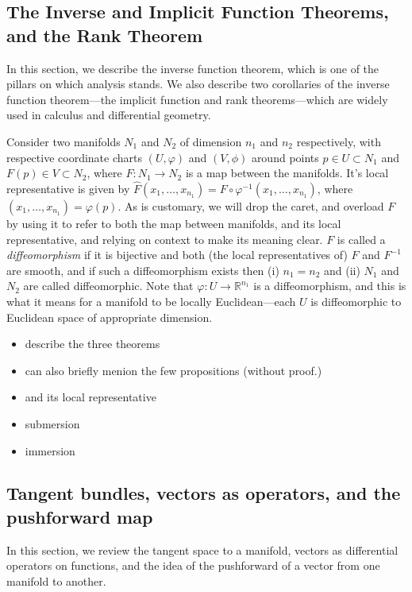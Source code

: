 \documentclass[psamsfonts]{amsart}
\theoremstyle{definition}
\theoremstyle{remark}
\newcommand*\R{\mathds{R}}
\numberwithin{equation}{section}
\begin{document}
\subsection{The Inverse and Implicit Function Theorems, and the Rank Theorem}
In this section, we describe the inverse function theorem, which is one of the pillars on which analysis stands. We also describe two corollaries of the inverse function theorem---the implicit function and rank theorems---which are widely used in calculus and differential geometry. 

Consider two manifolds $N_1$ and $N_2$ of dimension $n_1$ and $n_2$ respectively, with respective coordinate charts $(U, \varphi)$ and $(V, \phi)$ around points $p\in U\subset N_1$ and $F(p)\in V \subset N_2$, where $F:N_1 \rightarrow N_2$ is a map between the manifolds. It's local representative is given by $\hat F(x_1, \dots, x_{n_1}) = F\circ \varphi^{-1} (x_1, \dots, x_{n_1})$, where $(x_1, \dots, x_{n_1}) = \varphi(p)$. As is customary, we will drop the caret, and overload $F$ by using it to refer to both the map between manifolds, and its local representative, and relying on context to make its meaning clear. $F$ is called a \textit{diffeomorphism} if it is bijective and both (the local representatives of) $F$ and $F^{-1}$ are smooth, and if such a diffeomorphism exists then (i) $n_1=n_2$ and (ii) $N_1$ and $N_2$ are called diffeomorphic. Note that $\varphi:U\rightarrow \R^{n_1}$ is a diffeomorphism, and this is what it means for a manifold to be locally Euclidean---each $U$ is diffeomorphic to Euclidean space of appropriate dimension. 

\begin{itemize}
\item describe the three theorems
\item can also briefly menion the few propositions (without proof.)
\item and its local representative 
\item submersion
\item immersion
\end{itemize}

\subsection{Tangent bundles, vectors as operators, and the pushforward map}
In this section, we review the tangent space to a manifold, vectors as differential operators on functions, and the idea of the pushforward of a vector from one manifold to another. 
\end{document}
